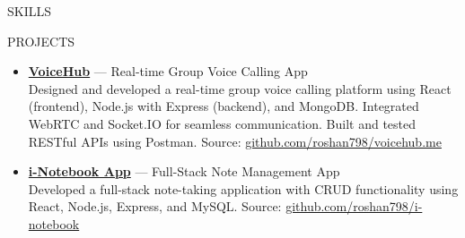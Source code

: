 \documentclass{resume} %
\begin{document}
\begin{rSection}{SKILLS}

\end{rSection}




\begin{rSection}{PROJECTS}
\begin{itemize}
\item \href{https://github.com/roshan798/voicehub.me}{\textbf{VoiceHub}} — Real-time Group Voice Calling App \\
Designed and developed a real-time group voice calling platform using React (frontend), Node.js with Express (backend), and MongoDB. Integrated WebRTC and Socket.IO for seamless communication. Built and tested RESTful APIs using Postman.
Source: \href{https://github.com/roshan798/voicehub.me}{github.com/roshan798/voicehub.me}

\item \href{https://i-notebook-app-nine.vercel.app/}{\textbf{i-Notebook App}} — Full-Stack Note Management App \\
Developed a full-stack note-taking application with CRUD functionality using React, Node.js, Express, and MySQL.
Source: \href{https://github.com/roshan798/i-notebook-app}{github.com/roshan798/i-notebook}
\end{itemize}
\end{rSection}
\end{document}
